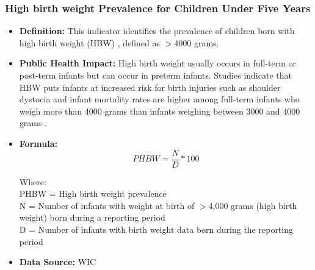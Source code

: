 \documentclass[12pt,letterpaper]{report}
\begin{document}
\subsubsection{High birth weight Prevalence for Children Under Five Years} 
	\begin{itemize}
	\item \textbf{Definition:} This indicator identifies the prevalence of children born with high birth weight (HBW) , defined as $>$4000 grams. 
	
	\item \textbf{Public Health Impact:} High birth weight usually occurs in full-term or post-term infants but can occur in preterm infants. Studies indicate that HBW puts infants at increased risk for birth injuries such as shoulder dystocia and infant mortality rates are higher among full-term infants who weigh more than 4000 grams than infants weighing between 3000 and 4000 grams \cite{mollberg2005high}. 
		
\item \textbf{Formula:} 
			\begin{equation} 
		PHBW = \frac{N}{D} * 100	
			\end{equation} 

Where: \\
	PHBW = High birth weight prevalence \\
			
			N = Number of infants with weight at birth of $>$4,000 grams (high birth weight) born during a reporting period \\
			
			D = Number of infants with birth weight data born during the reporting period \\

\item \textbf{Data Source:} WIC
	\end{itemize}


\end{document}

